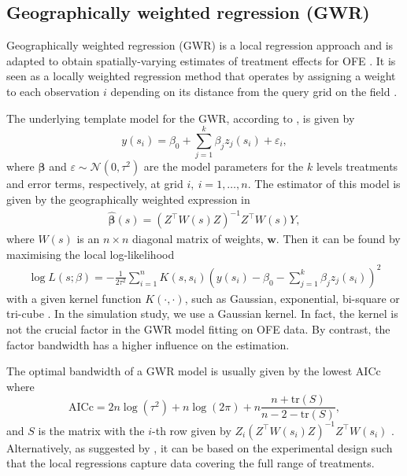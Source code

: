 \documentclass[a4paper]{article} 	%
\newcommand{\tr}{\mathrm{tr}}
\newcommand{\N}{\mathcal{N}}
\begin{document}
\subsection{Geographically weighted regression (GWR)}\label{sec:gwr}

Geographically weighted regression (GWR) is a local regression approach and is adapted to obtain spatially-varying estimates of treatment effects for OFE \parencite{Rakshit2020Novel}.  It is seen as a locally weighted regression method that operates by assigning a weight to each observation $i$ depending on its distance from the query grid on the field \parencite{Paez2002General}. 


The underlying template model for the GWR, according to \textcite{Leung2000Statistical}, is given by 
\begin{equation}\label{eq:basicgwr}
	y(s_i) = \beta_0 + \sum_{j=1}^{k} \beta_jz_j(s_i)+\varepsilon_i, 
\end{equation}
where $\bm{\beta}$ and $\varepsilon\sim \N(0,\tau^2)$ are the model parameters for the $k$ levels treatments and error terms, respectively, at grid $i,\ i=1,\ldots,n$. The estimator of this model is given by the geographically weighted expression in 
\begin{eqnarray}\label{eq:betahat}
	\bm{\hat{\beta}}(s) = \left( Z^\top W(s) Z \right)^{-1}Z^\top W(s) Y,
\end{eqnarray}
where $W(s)$ is an $n\times n$ diagonal matrix of weights, $\bm{w}$. Then it can be found by maximising the local log-likelihood 
\begin{eqnarray}\label{eq:locallog}
	\log L(s;\beta) = - \frac{1}{2\tau^2}\sum_{i=1}^{n}K(s,s_i)\left( y(s_i) -\beta_0 - \sum_{j=1}^{k}\beta_jz_j(s_i) \right)^2 
\end{eqnarray}
with a given kernel function $K(\cdot,\cdot)$, such as Gaussian, exponential, bi-square or tri-cube \parencite{Gollini2015GWmodel}. In the simulation study, we use a Gaussian kernel. In fact, the kernel is not the crucial factor in the GWR model fitting on OFE data. By contrast, the factor bandwidth has a higher influence on the estimation.  


The optimal bandwidth of a GWR model is usually given by the lowest AICc where 
\begin{equation}\label{eq:aicc}
	\mbox{AICc} = 2n\log (\tau^2) + n \log (2\pi) + n\frac{ n+\tr (S) }{n-2-\tr (S)},
\end{equation}
and $S$ is the matrix with the $i$-th row given by $Z_i\left( Z^\top W(s_i) Z \right)^{-1}Z^\top W(s_i)$ \parencite{Evans2020Assessment}. Alternatively, as suggested by \textcite{Rakshit2020Novel}, it can be based on the experimental design such that the local regressions capture data covering the full range of treatments.
\end{document}
